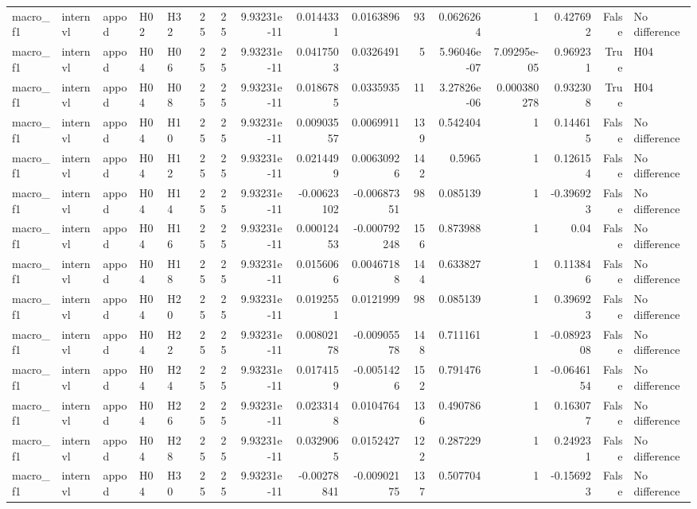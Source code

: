 \begin{longtable}{lllllrrrrrrrrrrl}
macro\_f1 & internvl & appod & H02 & H32 & 25 & 25 & 9.93231e-11 & 0.0144331 & 0.0163896 & 93 & 0.0626264 & 1 & 0.427692 & False & No difference \\
macro\_f1 & internvl & appod & H04 & H06 & 25 & 25 & 9.93231e-11 & 0.0417503 & 0.0326491 & 5 & 5.96046e-07 & 7.09295e-05 & 0.969231 & True & H04 \\
macro\_f1 & internvl & appod & H04 & H08 & 25 & 25 & 9.93231e-11 & 0.0186785 & 0.0335935 & 11 & 3.27826e-06 & 0.000380278 & 0.932308 & True & H04 \\
macro\_f1 & internvl & appod & H04 & H10 & 25 & 25 & 9.93231e-11 & 0.00903557 & 0.0069911 & 139 & 0.542404 & 1 & 0.144615 & False & No difference \\
macro\_f1 & internvl & appod & H04 & H12 & 25 & 25 & 9.93231e-11 & 0.0214499 & 0.00630926 & 142 & 0.5965 & 1 & 0.126154 & False & No difference \\
macro\_f1 & internvl & appod & H04 & H14 & 25 & 25 & 9.93231e-11 & -0.00623102 & -0.00687351 & 98 & 0.085139 & 1 & -0.396923 & False & No difference \\
macro\_f1 & internvl & appod & H04 & H16 & 25 & 25 & 9.93231e-11 & 0.00012453 & -0.000792248 & 156 & 0.873988 & 1 & 0.04 & False & No difference \\
macro\_f1 & internvl & appod & H04 & H18 & 25 & 25 & 9.93231e-11 & 0.0156066 & 0.00467188 & 144 & 0.633827 & 1 & 0.113846 & False & No difference \\
macro\_f1 & internvl & appod & H04 & H20 & 25 & 25 & 9.93231e-11 & 0.0192551 & 0.0121999 & 98 & 0.085139 & 1 & 0.396923 & False & No difference \\
macro\_f1 & internvl & appod & H04 & H22 & 25 & 25 & 9.93231e-11 & 0.00802178 & -0.00905578 & 148 & 0.711161 & 1 & -0.0892308 & False & No difference \\
macro\_f1 & internvl & appod & H04 & H24 & 25 & 25 & 9.93231e-11 & 0.0174159 & -0.0051426 & 152 & 0.791476 & 1 & -0.0646154 & False & No difference \\
macro\_f1 & internvl & appod & H04 & H26 & 25 & 25 & 9.93231e-11 & 0.0233148 & 0.0104764 & 136 & 0.490786 & 1 & 0.163077 & False & No difference \\
macro\_f1 & internvl & appod & H04 & H28 & 25 & 25 & 9.93231e-11 & 0.0329065 & 0.0152427 & 122 & 0.287229 & 1 & 0.249231 & False & No difference \\
macro\_f1 & internvl & appod & H04 & H30 & 25 & 25 & 9.93231e-11 & -0.00278841 & -0.00902175 & 137 & 0.507704 & 1 & -0.156923 & False & No difference \\

\end{longtable}
